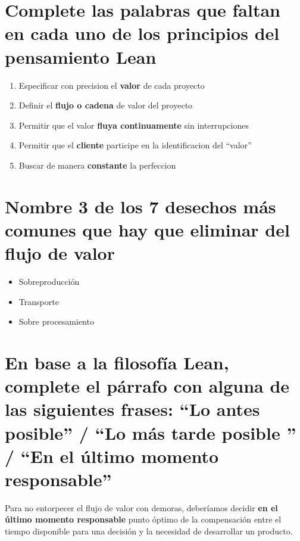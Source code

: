 \documentclass{article}
\begin{document}
\section{Complete las palabras que faltan en cada uno de los 
principios del pensamiento Lean}

\begin{enumerate}
	\item Especificar con precision el \textbf{valor} 
		de cada proyecto
	\item Definir el \textbf{flujo o cadena} de valor del proyecto
	\item Permitir que el valor \textbf{fluya continuamente} 
		sin interrupciones
	\item Permitir que el \textbf{cliente} participe en 
		la identificacion del ``valor''
	\item Buscar de manera \textbf{constante} la perfeccion
\end{enumerate}

\section{Nombre 3 de los 7 desechos más comunes que hay que 
eliminar del flujo de valor}
	\begin{itemize}
		\item Sobreproducción
		\item Transporte
		\item Sobre procesamiento
	\end{itemize}
	
\section{En base a la filosofía Lean, complete el párrafo con 
alguna de las siguientes frases: ``Lo antes posible''
/ ``Lo más tarde posible '' / ``En el último momento responsable''}

Para no entorpecer el flujo de valor con demoras, deberíamos decidir
\textbf{en el último momento responsable} punto óptimo de
la compensación entre el tiempo disponible para una 
decisión y la necesidad de desarrollar un producto.
\end{document}
